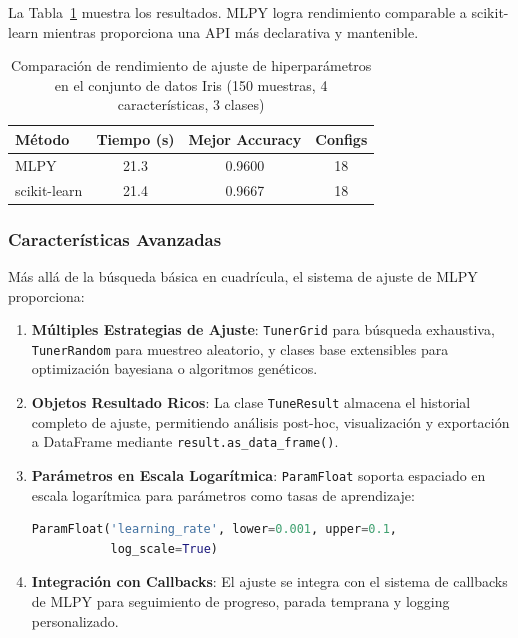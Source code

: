 La Tabla~\ref{tab:automl_results} muestra los resultados. MLPY logra rendimiento comparable a scikit-learn mientras proporciona una API más declarativa y mantenible.

\begin{table}[ht]
\centering
\caption{Comparación de rendimiento de ajuste de hiperparámetros en el conjunto de datos Iris (150 muestras, 4 características, 3 clases)}
\label{tab:automl_results}
\begin{tabular}{lccc}
\toprule
\textbf{Método} & \textbf{Tiempo (s)} & \textbf{Mejor Accuracy} & \textbf{Configs} \\
\midrule
MLPY & 21.3 & 0.9600 & 18 \\
scikit-learn & 21.4 & 0.9667 & 18 \\
\bottomrule
\end{tabular}
\end{table}

\subsubsection{Características Avanzadas}

Más allá de la búsqueda básica en cuadrícula, el sistema de ajuste de MLPY proporciona:

\begin{enumerate}
    \item \textbf{Múltiples Estrategias de Ajuste}: \texttt{TunerGrid} para búsqueda exhaustiva, \texttt{TunerRandom} para muestreo aleatorio, y clases base extensibles para optimización bayesiana o algoritmos genéticos.

    \item \textbf{Objetos Resultado Ricos}: La clase \texttt{TuneResult} almacena el historial completo de ajuste, permitiendo análisis post-hoc, visualización y exportación a DataFrame mediante \texttt{result.as\_data\_frame()}.

    \item \textbf{Parámetros en Escala Logarítmica}: \texttt{ParamFloat} soporta espaciado en escala logarítmica para parámetros como tasas de aprendizaje:
    \begin{lstlisting}[language=Python]
ParamFloat('learning_rate', lower=0.001, upper=0.1,
           log_scale=True)
    \end{lstlisting}

    \item \textbf{Integración con Callbacks}: El ajuste se integra con el sistema de callbacks de MLPY para seguimiento de progreso, parada temprana y logging personalizado.
\end{enumerate}

